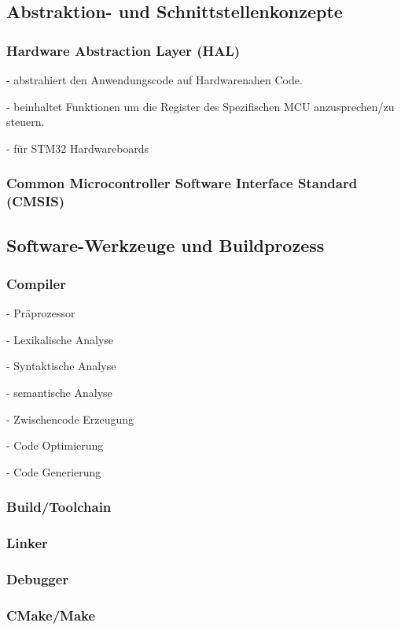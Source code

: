 \subsection{Abstraktion- und Schnittstellenkonzepte}
\subsubsection*{Hardware Abstraction Layer (HAL)}

- abstrahiert den Anwendungscode auf Hardwarenahen Code.

- beinhaltet Funktionen um die Register des Spezifischen MCU anzusprechen/zu steuern.

- für STM32 Hardwareboards

\subsubsection*{Common Microcontroller Software Interface Standard (CMSIS)}

\subsection{Software-Werkzeuge und Buildprozess}
\subsubsection*{Compiler}
- Präprozessor

- Lexikalische Analyse

- Syntaktische Analyse

- semantische Analyse

- Zwischencode Erzeugung

- Code Optimierung

- Code Generierung

\subsubsection*{Build/Toolchain}

\subsubsection*{Linker}

\subsubsection*{Debugger}

\subsubsection*{CMake/Make}


